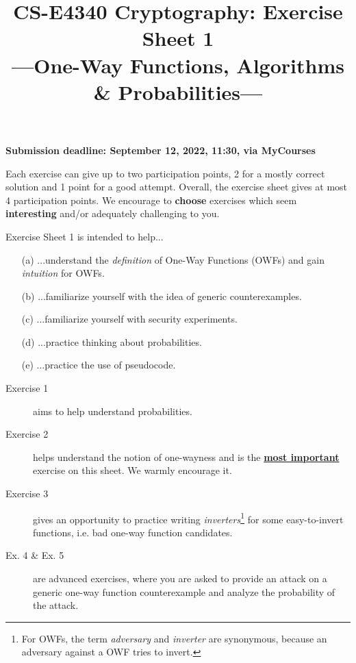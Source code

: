 \documentclass[envcountsame,runningheads,notitlepage]{../llncs}
\title{CS-E4340 Cryptography: Exercise Sheet 1\\[0.5\baselineskip]
\large ---One-Way Functions, Algorithms \& Probabilities---}
\author{}\institute{}%
\date{}
\theoremstyle{definition}
\begin{document}
\maketitle

\noindent
\textbf{Submission deadline: September 12, 2022, 11:30, via MyCourses}

\medskip
\noindent
Each exercise can give up to two participation points, 2 for a mostly correct solution and 1 point for a good attempt. Overall, the exercise sheet gives at most 4 participation points. We encourage to \textbf{choose} exercises which seem \textbf{interesting} and/or adequately challenging to you. %


\medskip
\noindent
Exercise Sheet 1 is intended to help...
\begin{itemize}
\item[(a)] ...understand the \emph{definition} of One-Way Functions (OWFs) and gain \emph{intuition} for OWFs.
\item[(b)] ...familiarize yourself with the idea of generic counterexamples.
\item[(c)] ...familiarize yourself with security experiments.
\item[(d)] ...practice thinking about probabilities.
\item[(e)] ...practice the use of pseudocode.
\end{itemize}

\begin{description}
\item[Exercise 1] aims to help understand probabilities. 
\item[Exercise 2] helps understand the notion of one-wayness and is the \underline{\textbf{most important}} exercise on this sheet. We warmly encourage it.
\item[Exercise 3] gives an opportunity to practice writing \emph{inverters}\footnote{For OWFs, the term \emph{adversary} and \emph{inverter} are synonymous, because an adversary against a OWF tries to invert.} for some easy-to-invert functions, i.e. bad one-way function candidates.
\item[Ex. 4 \& Ex. 5] are advanced exercises, where you are asked to provide an attack on a generic one-way function counterexample and analyze the probability of the attack.
\end{description}
\end{document}
